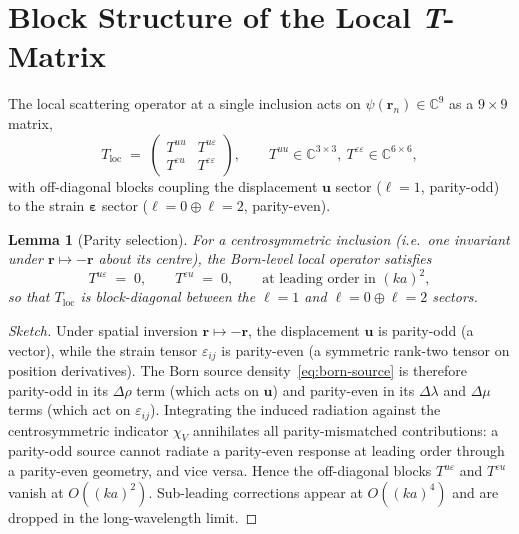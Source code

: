 \documentclass[11pt,a4paper]{article}
\newcommand{\eps}{\varepsilon}
\newcommand{\rrn}{\bm{r}_n}
\newcommand{\uu}{\bm{u}}
\theoremstyle{plain}
\newtheorem{lemma}[proposition]{Lemma}
\theoremstyle{definition}
\theoremstyle{remark}
\begin{document}
\section{Block Structure of the Local \emph{T}-Matrix}\label{sec:tblock}
The local scattering operator at a single inclusion acts on
$\psi(\rrn)\in\mathbb{C}^9$ as a $9\times 9$ matrix,
\begin{equation}
  T_{\text{loc}}
  \;=\;
  \begin{pmatrix}
    T^{uu} & T^{u\eps}\\[2pt]
    T^{\eps u} & T^{\eps\eps}
  \end{pmatrix},
  \qquad
  T^{uu}\in\mathbb{C}^{3\times 3},\
  T^{\eps\eps}\in\mathbb{C}^{6\times 6},
  \label{eq:T-block}
\end{equation}
with off-diagonal blocks coupling the displacement $\uu$ sector
($\ell=1$, parity-odd) to the strain $\bm{\eps}$ sector
($\ell=0\oplus\ell=2$, parity-even).

\begin{lemma}[Parity selection]\label{lem:parity}
For a centrosymmetric inclusion (i.e.\ one invariant under
$\bm{r}\mapsto -\bm{r}$ about its centre), the Born-level local
operator satisfies
\begin{equation}
  T^{u\eps} \;=\; 0,
  \qquad
  T^{\eps u} \;=\; 0,
  \qquad\text{at leading order in }(ka)^2,
\end{equation}
so that $T_{\text{loc}}$ is block-diagonal between the
$\ell=1$ and $\ell=0\oplus\ell=2$ sectors.
\end{lemma}

\begin{proof}[Sketch]
Under spatial inversion $\bm{r}\mapsto-\bm{r}$, the displacement
$\uu$ is parity-odd (a vector), while the strain tensor $\eps_{ij}$ is
parity-even (a symmetric rank-two tensor on position derivatives).
The Born source density~\eqref{eq:born-source} is therefore parity-odd
in its $\Delta\rho$ term (which acts on $\uu$) and parity-even in its
$\Delta\lambda$ and $\Delta\mu$ terms (which act on $\eps_{ij}$).
Integrating the induced radiation against the centrosymmetric
indicator $\chi_V$ annihilates all parity-mismatched contributions:
a parity-odd source cannot radiate a parity-even response at leading
order through a parity-even geometry, and vice versa.  Hence the
off-diagonal blocks $T^{u\eps}$ and $T^{\eps u}$ vanish at
$O((ka)^2)$.  Sub-leading corrections appear at $O((ka)^4)$ and are
dropped in the long-wavelength limit.
\end{proof}
\end{document}
